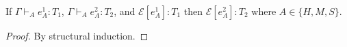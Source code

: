 \begin{lemma}
\label{ecp}
If $\Gamma\vdash_{A}e_{A}^{1}:T_{1}$, $\Gamma\vdash_{A}e_{A}^{2}:T_{2}$, and $\mathscr{E}[e_{A}^{1}]:T_{1}$ then $\mathscr{E}[e_{A}^{2}]:T_{2}$ where $A\in\lbrace H,M,S\rbrace$.
\begin{proof}
By structural induction.
\end{proof}
\end{lemma}